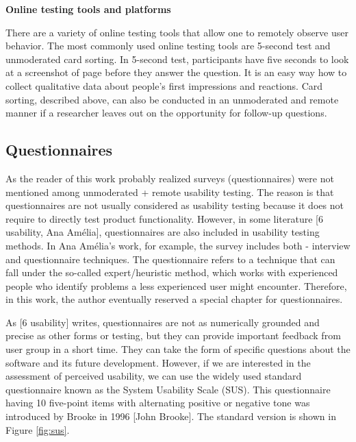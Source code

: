 \documentclass[a4paper,10pt,twoside]{article}
\begin{document}
\noindent \textbf {Online testing tools and platforms}

\noindent There are a variety of online testing tools that allow one to remotely observe user behavior. The most commonly used online testing tools are 5-second test and unmoderated card sorting.  In 5-second test, participants have five seconds to look at a screenshot of page before they answer the question. It is an easy way how to collect qualitative data about people’s first impressions and reactions. Card sorting, described above, can also be conducted in an unmoderated and remote manner if a researcher leaves out on the opportunity for follow-up questions.

\newpage
\vspace*{-1cm}
\subsection{Questionnaires}

\noindent As the reader of this work probably realized surveys (questionnaires) were not mentioned among unmoderated + remote usability testing. The reason is that questionnaires are not usually considered as usability testing because it does not require to directly test product functionality. However, in some literature [6 usability, Ana Amélia], questionnaires are also included in usability testing methods. In Ana Amélia's work, for example, the survey includes both - interview and questionnaire techniques. The questionnaire refers to a technique that can fall under the so-called expert/heuristic method, which works with experienced people who identify problems a less experienced user might encounter. Therefore, in this work, the author eventually reserved a special chapter for questionnaires.

As [6 usability] writes, questionnaires are not as numerically grounded and precise as other forms or testing, but they can provide important feedback from user group in a short time. They can take the form of specific questions about the software and its future development. However, if we are interested in the assessment of perceived usability, we can use the widely used standard questionnaire known as the System Usability Scale (SUS). This questionnaire having 10 five-point items with alternating positive or negative tone was introduced by Brooke in 1996 [John Brooke]. The standard version is shown in Figure \ref{fig:sus}.
\end{document}
